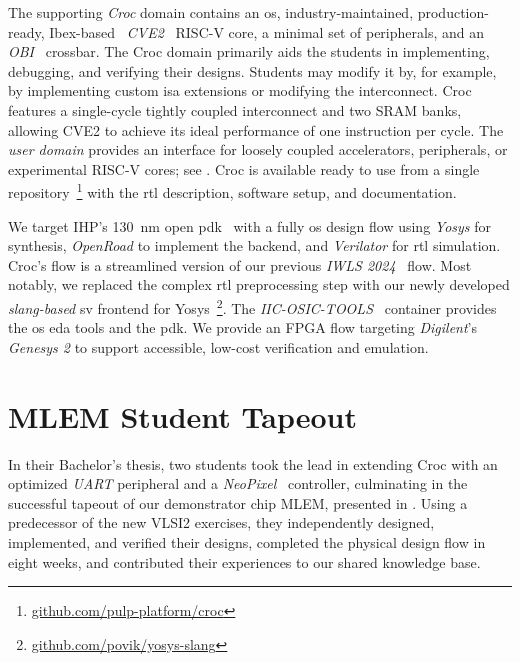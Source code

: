 \documentclass[a4paper, 10pt, unnumberedsections, twoside]{LTJournalArticle}
\newcommand{\riscv}{\mbox{RISC-V}}
\begin{document}
The supporting \emph{Croc} domain contains an \gls{os}, industry-maintained, production-ready, Ibex-based~\cite{lowrisc2015ibex}
 \emph{CVE2}~\cite{openhw2022cve2} {\riscv} core, a minimal set of peripherals, and an \emph{OBI}~\cite{silicon2020obi1} crossbar.
%
The Croc domain primarily aids the students in implementing, debugging, and verifying their designs.
Students may modify it by, for example, by implementing custom \gls{isa} extensions or modifying the interconnect.
%
Croc features a single-cycle tightly coupled interconnect and two {SRAM} banks, allowing {CVE2} to achieve its ideal performance of one instruction per cycle.
%
The \emph{user domain} provides an interface for loosely coupled accelerators, peripherals, or experimental {\riscv} cores; see .
%
Croc is available ready to use from a single repository~\footnote{\url{github.com/pulp-platform/croc}} with the \gls{rtl} description, software setup, and documentation.
%



%

We target IHP's \SI{130}{\nano\metre} open \gls{pdk}~\cite{herman2024reflections} with a fully \gls{os} design flow using \emph{Yosys} for synthesis, \emph{OpenRoad} to implement the backend, and \emph{Verilator} for \gls{rtl} simulation.
%
Croc's flow is a streamlined version of our previous \emph{IWLS 2024}~\cite{sauter2024insights} flow. 
Most notably, we replaced the complex \gls{rtl} preprocessing step with our newly developed \emph{slang-based} \gls{sv} frontend for Yosys~\footnote{\url{github.com/povik/yosys-slang}}.
%
The \emph{IIC-OSIC-TOOLS}~\cite{iic-jku2024iic-osic-tools} container provides the \gls{os} \gls{eda} tools and the \gls{pdk}.
%
We provide an FPGA flow targeting \emph{Digilent}'s \emph{Genesys 2} to support accessible, low-cost verification and emulation.




\section{MLEM Student Tapeout}

In their Bachelor's thesis, two students took the lead in extending Croc with an optimized \emph{UART} peripheral and a \emph{NeoPixel}~\cite{burgess2013adafruit} controller, culminating in the successful tapeout of our demonstrator chip MLEM, presented in . 
%
Using a predecessor of the new VLSI2 exercises, they independently designed, implemented, and verified their designs, completed the physical design flow in eight weeks, and contributed their experiences to our shared knowledge base.
\end{document}

